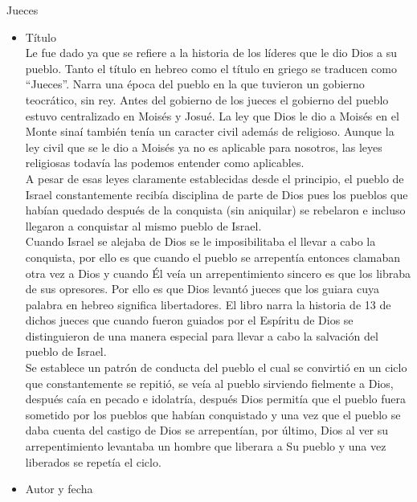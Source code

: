 %
%
	\begin{section}{Jueces}
		\begin{itemize}
			\item Título\\
				Le fue dado ya que se refiere a la historia de los líderes que le dio Dios a su pueblo. Tanto el título en hebreo como el título en griego se traducen como ``Jueces''. Narra una época del pueblo en la que tuvieron un gobierno teocrático, sin rey. Antes del gobierno de los jueces el gobierno del pueblo estuvo centralizado en Moisés y Josué. La ley que Dios le dio a Moisés en el Monte sinaí también tenía un caracter civil además de religioso. Aunque la ley civil que se le dio a Moisés ya no es aplicable para nosotros, las leyes religiosas todavía las podemos entender como aplicables.\\
				A pesar de esas leyes claramente establecidas desde el principio, el pueblo de Israel constantemente recibía disciplina de parte de Dios pues los pueblos que habían quedado después de la conquista (sin aniquilar) se rebelaron e incluso llegaron a conquistar al mismo pueblo de Israel.\\
				Cuando Israel se alejaba de Dios se le imposibilitaba el llevar a cabo la conquista, por ello es que cuando el pueblo se arrepentía entonces clamaban otra vez a Dios y cuando Él veía un arrepentimiento sincero es que los libraba de sus opresores. Por ello es que Dios levantó jueces que los guiara cuya palabra en hebreo significa libertadores. El libro narra la historia de 13 de dichos jueces que cuando fueron guiados por el Espíritu de Dios se distinguieron de una manera especial para llevar a cabo la salvación del pueblo de Israel.\\
				Se establece un patrón de conducta del pueblo el cual se convirtió en un ciclo que constantemente se repitió,  se veía al pueblo sirviendo fielmente a Dios, después caía en pecado e idolatría, después Dios permitía que el pueblo fuera sometido por los pueblos que habían conquistado y una vez que el pueblo se daba cuenta del castigo de Dios se arrepentían, por último, Dios al ver su arrepentimiento levantaba un hombre que liberara a Su pueblo y una vez liberados se repetía el ciclo.
			\item Autor y fecha\\

\end{itemize}
\end{section}
